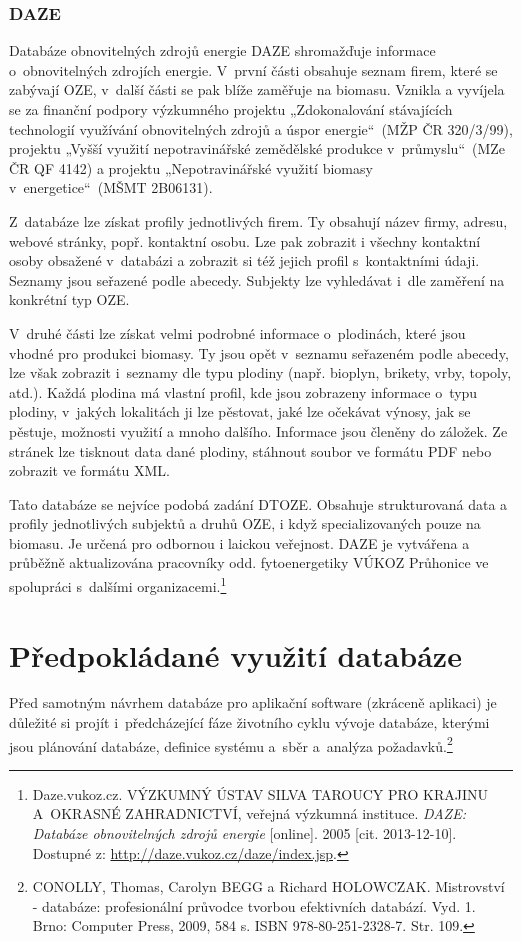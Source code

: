 \documentclass[11pt,a4paper]{article}
\begin{document}
\subsubsection{DAZE}
Databáze obnovitelných zdrojů energie DAZE shromažďuje informace o~obnovitelných zdrojích energie. V~první části obsahuje seznam firem, které se zabývají OZE, v~další části se pak blíže zaměřuje na biomasu. Vznikla a vyvíjela se za finanční podpory výzkumného projektu „Zdokonalování stávajících technologií využívání obnovitelných zdrojů a úspor energie“~(MŽP ČR 320/3/99), projektu „Vyšší využití nepotravinářské zemědělské produkce v~průmyslu“~(MZe ČR QF 4142) a projektu „Nepotravinářské využití biomasy v~energetice“~(MŠMT 2B06131).  

Z~databáze lze získat profily jednotlivých firem. Ty obsahují název firmy, adresu, webové stránky, popř. kontaktní osobu. Lze pak zobrazit i všechny kontaktní osoby obsažené v~databázi a zobrazit si též jejich profil s~kontaktními údaji. Seznamy jsou seřazené podle abecedy.  Subjekty lze vyhledávat i~dle zaměření na konkrétní typ OZE. 

V~druhé části lze získat velmi podrobné informace o~plodinách, které jsou vhodné pro produkci biomasy. Ty jsou opět v~seznamu seřazeném podle abecedy, lze však zobrazit i~seznamy dle typu plodiny (např. bioplyn, brikety, vrby, topoly, atd.). Každá plodina má vlastní profil, kde jsou zobrazeny informace o~typu plodiny, v~jakých lokalitách ji lze pěstovat, jaké lze očekávat výnosy, jak se pěstuje, možnosti využití a mnoho dalšího. Informace jsou členěny do záložek. Ze stránek lze tisknout data dané plodiny, stáhnout soubor ve formátu PDF nebo zobrazit ve formátu XML. 

Tato databáze se nejvíce podobá zadání DTOZE. Obsahuje strukturovaná data a profily jednotlivých subjektů a druhů OZE, i když specializovaných pouze na biomasu. Je určená pro odbornou i laickou veřejnost. DAZE je vytvářena a průběžně aktualizována pracovníky odd. fytoenergetiky VÚKOZ Průhonice ve spolupráci s~dalšími organizacemi.\footnote{Daze.vukoz.cz. VÝZKUMNÝ ÚSTAV SILVA TAROUCY PRO KRAJINU A~OKRASNÉ ZAHRADNICTVÍ, veřejná výzkumná instituce. \textit{DAZE: Databáze obnovitelných zdrojů energie} [online]. 2005 [cit. 2013-12-10]. Dostupné z: \url{http://daze.vukoz.cz/daze/index.jsp}.}

\newpage

\section{Předpokládané využití databáze}
Před samotným návrhem databáze pro aplikační software (zkráceně aplikaci) je důležité si projít i~předcházející fáze životního cyklu vývoje databáze, kterými jsou plánování databáze, definice systému a~sběr a~analýza požadavků.\footnote{CONOLLY, Thomas, Carolyn BEGG a Richard HOLOWCZAK. Mistrovství - databáze: profesionální průvodce tvorbou efektivních databází. Vyd. 1. Brno: Computer Press, 2009, 584 s. ISBN 978-80-251-2328-7. Str. 109.} 
\end{document}
